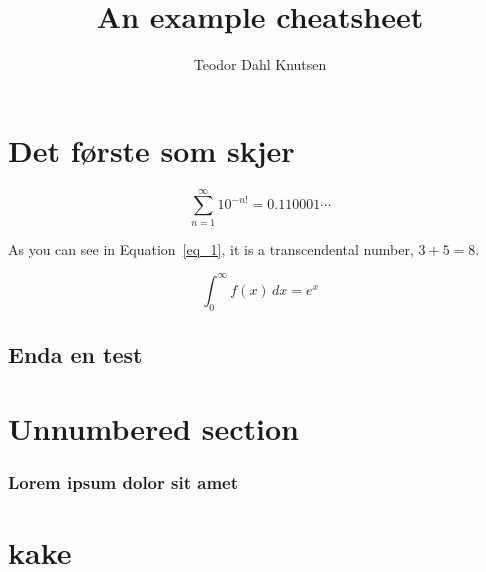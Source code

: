 \documentclass[defaultpackages]{cheatsheet}
\title{An example cheatsheet}
\author{Teodor Dahl Knutsen}
\begin{document}
\tableofcontents

\section{Det første som skjer}

\lipsum[1-1]

\begin{equation}
	\sum_{n=1}^\infty 10^{-n!}=0.110001\cdots\label{eq_1}
\end{equation}

As you can see in Equation~\ref{eq_1}, it is a transcendental number, $3 + 5 = 8$.

\lipsum[2-2]

\[ \int_0^\infty f(x)\, dx = e^x \]

\lipsum[1-1]

\subsection{Enda en test}

\lipsum[1-1]

\section*{Unnumbered section}

\subsubsection{Lorem ipsum dolor sit amet}

\lipsum[1-1]

\section{kake}

\lipsum[3-50]
\end{document}
